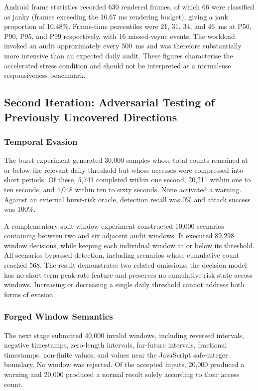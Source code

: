 Android frame statistics recorded 630 rendered frames, of which 66 were classified as janky (frames exceeding the 16.67 ms rendering budget), giving a jank proportion of 10.48\%. Frame-time percentiles were 21, 31, 34, and 46~ms at P50, P90, P95, and P99 respectively, with 16 missed-vsync events. The workload invoked an audit approximately every 500~ms and was therefore substantially more intensive than an expected daily audit. These figures characterise the accelerated stress condition and should not be interpreted as a normal-use responsiveness benchmark.

\subsection{Second Iteration: Adversarial Testing of Previously Uncovered Directions}

\subsubsection{Temporal Evasion}

The burst experiment generated 30,000 samples whose total counts remained at or below the relevant daily threshold but whose accesses were compressed into short periods. Of these, 5,741 completed within one second, 20,211 within one to ten seconds, and 4,048 within ten to sixty seconds. None activated a warning. Against an external burst-risk oracle, detection recall was 0\% and attack success was 100\%.

A complementary split-window experiment constructed 10,000 scenarios containing between two and six adjacent audit windows. It executed 89,298 window decisions, while keeping each individual window at or below its threshold. All scenarios bypassed detection, including scenarios whose cumulative count reached 568. The result demonstrates two related omissions: the decision model has no short-term peak-rate feature and preserves no cumulative risk state across windows. Increasing or decreasing a single daily threshold cannot address both forms of evasion.

\subsubsection{Forged Window Semantics}

The next stage submitted 40,000 invalid windows, including reversed intervals, negative timestamps, zero-length intervals, far-future intervals, fractional timestamps, non-finite values, and values near the JavaScript safe-integer boundary. No window was rejected. Of the accepted inputs, 20,000 produced a warning and 20,000 produced a normal result solely according to their access count.

